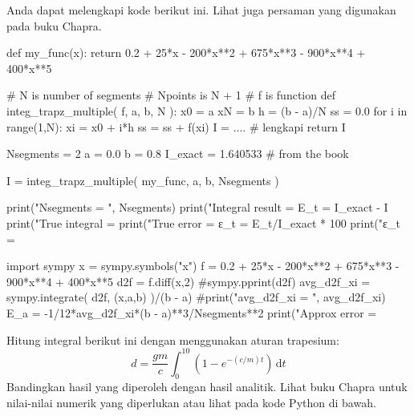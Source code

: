 Anda dapat melengkapi kode berikut ini. Lihat juga persaman yang digunakan pada
buku Chapra.
\begin{pythoncode}
def my_func(x):
    return 0.2 + 25*x - 200*x**2 + 675*x**3 - 900*x**4 + 400*x**5

# N is number of segments
# Npoints is N + 1
# f is function
def integ_trapz_multiple( f, a, b, N ):
    x0 = a
    xN = b
    h = (b - a)/N
    ss = 0.0
    for i in range(1,N):
        xi = x0 + i*h
        ss = ss + f(xi)
    I = .... # lengkapi
    return I

Nsegments = 2
a = 0.0
b = 0.8
I_exact = 1.640533 # from the book

I = integ_trapz_multiple( my_func, a, b, Nsegments )

print("Nsegments = ", Nsegments)
print("Integral result = %
E_t = I_exact - I
print("True integral   = %
print("True error      = %
ε_t = E_t/I_exact * 100
print("ε_t             = %

import sympy
x = sympy.symbols("x")
f = 0.2 + 25*x - 200*x**2 + 675*x**3 - 900*x**4 + 400*x**5
d2f = f.diff(x,2)
#sympy.pprint(d2f)
avg_d2f_xi = sympy.integrate( d2f, (x,a,b) )/(b - a)
#print("avg_d2f_xi = ", avg_d2f_xi)
E_a = -1/12*avg_d2f_xi*(b - a)**3/Nsegments**2
print("Approx error    = %
\end{pythoncode}

\begin{soal}
Hitung integral berikut ini dengan menggunakan aturan trapesium:
\begin{equation*}
d = \frac{gm}{c} \int_{0}^{10} (1 - e^{-(c/m)t}) \, \mathrm{d}t
\end{equation*}
Bandingkan hasil yang diperoleh dengan hasil analitik. Lihat buku Chapra untuk nilai-nilai
numerik yang diperlukan atau lihat pada kode Python di bawah.
\end{soal}

